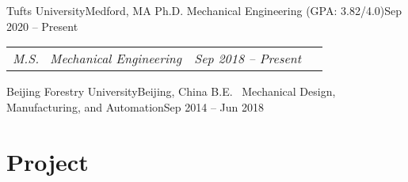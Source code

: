 \documentclass[letterpaper,11pt]{article}
\begin{document}
\newcommand{\EduRoleNoHead}[2]{
  \vspace{-5pt}\item[]
    \begin{tabular*}{1\textwidth}[t]{l@{\extracolsep{\fill}}r}
    \textit{#1} & \textit{\small #2} \\
    \end{tabular*}\vspace{-10pt}}
    
\BeginEduList
    \EduRole
      {Tufts University}{Medford, MA}
      {Ph.D. Mechanical Engineering \footnotesize{(GPA: 3.82/4.0)}}{Sep 2020 -- Present~~\,}
    \EduRoleNoHead
      {M.S.~ Mechanical Engineering}{Sep 2018 -- Present~~\,}
    \EduRole
      {Beijing Forestry University}{Beijing, China}
      {B.E.~ Mechanical Design, Manufacturing, and Automation}{Sep 2014 -- Jun 2018}
\EndEduList

\section{Project} %

\newcommand{\ProjList}{\begin{itemize}[leftmargin=0.00in]}
\newcommand{\ProjListEnd}{\end{itemize}\vspace{-5pt}}

\newcommand{\ProjHead}[2]{ %
  \vspace{0pt}\item[]
    \begin{tabular*}{1\textwidth}[t]{l@{\extracolsep{\fill}}r}
    \textbf{#1}&{\small{\textit{#2}}} \\
    \end{tabular*}\vspace{-3pt}
}

\newcommand{\ProjListII}{\begin{itemize}[leftmargin=0.15in]} 
\newcommand{\ProjListIIEnd}{\end{itemize}\vspace{-5pt}}

\newcommand{\ProjBullet}[1]
{\item\small\justifying{\vspace{-3pt}{\hspace{0pt}#1\vspace{0pt}}}}
\end{document}
